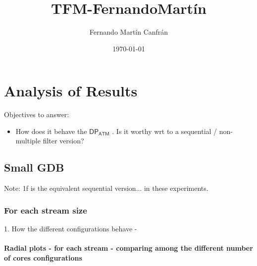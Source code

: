 \documentclass[12pt,a4paper]{article}
\title{TFM-FernandoMartín}
\author{Fernando Martín Canfrán}
\date{\today}
\newcommand{\DPATM}{$\mathsf{DP_{ATM}}$ }
\begin{document}
\maketitle

\section{Analysis of Results}

Objectives to answer:
\begin{itemize}
    \item How does it behave the \DPATM. Is it worthy wrt to a sequential / non-multiple filter
    version?
\end{itemize}

\subsection{Small GDB}

Note: 1f is the equivalent sequential version... in these experiments.

\subsubsection{For each stream size}

1. How the different configurations behave - 

\paragraph{Radial plots - for each stream - comparing among the different number of cores configurations\\}
\newpage
\end{document}
